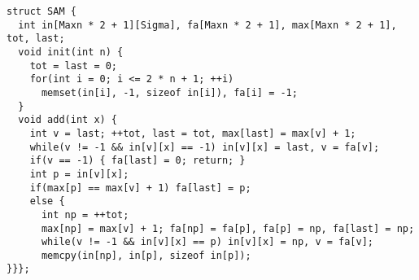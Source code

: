 \begin{lstlisting}
struct SAM {
  int in[Maxn * 2 + 1][Sigma], fa[Maxn * 2 + 1], max[Maxn * 2 + 1], tot, last;
  void init(int n) {
    tot = last = 0;
    for(int i = 0; i <= 2 * n + 1; ++i)
      memset(in[i], -1, sizeof in[i]), fa[i] = -1;
  }
  void add(int x) {
    int v = last; ++tot, last = tot, max[last] = max[v] + 1;
    while(v != -1 && in[v][x] == -1) in[v][x] = last, v = fa[v];
    if(v == -1) { fa[last] = 0; return; }
    int p = in[v][x];
    if(max[p] == max[v] + 1) fa[last] = p;
    else {
      int np = ++tot;
      max[np] = max[v] + 1; fa[np] = fa[p], fa[p] = np, fa[last] = np;
      while(v != -1 && in[v][x] == p) in[v][x] = np, v = fa[v];
      memcpy(in[np], in[p], sizeof in[p]);
}}};

\end{lstlisting}